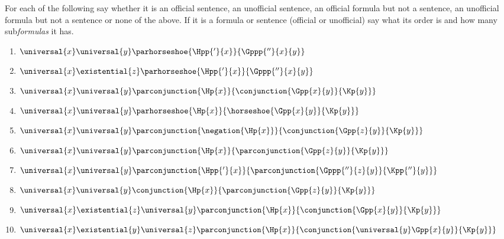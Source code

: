  For each of the following say whether it is an official sentence, an unofficial sentence, an official formula but not a sentence, an unofficial formula but not a sentence or none of the above. 
If it is a formula or sentence (official or unofficial) say what its order is and how many sub\emph{formulas} it has.
\begin{multicols}{2}
\begin{enumerate}
\item {$\universal{\variable{x}}\universal{\variable{y}}\parhorseshoe{\Hpp{'}{\variable{x}}}{\Gppp{''}{\variable{x}}{\variable{y}}}$}
\item {$\universal{\variable{x}}\existential{\variable{z}}\parhorseshoe{\Hpp{'}{\variable{x}}}{\Gppp{''}{\variable{x}}{\variable{y}}}$}
\item {$\universal{\variable{x}}\universal{\variable{y}}\parconjunction{\Hp{\variable{x}}}{\conjunction{\Gpp{\variable{x}}{\variable{y}}}{\Kp{\variable{y}}}}$}
\item {$\universal{\variable{x}}\universal{\variable{y}}\parhorseshoe{\Hp{\variable{x}}}{\horseshoe{\Gpp{\variable{x}}{\variable{y}}}{\Kp{\variable{y}}}}$}
\item {$\universal{\variable{x}}\universal{\variable{y}}\parconjunction{\negation{\Hp{\variable{x}}}}{\conjunction{\Gpp{\variable{z}}{\variable{y}}}{\Kp{\variable{y}}}}$}
\item {$\universal{\variable{x}}\universal{\variable{y}}\parconjunction{\Hp{\variable{x}}}{\parconjunction{\Gpp{\variable{z}}{\variable{y}}}{\Kp{\variable{y}}}}$}
\item {$\universal{\variable{x}}\universal{\variable{y}}\parconjunction{\Hpp{'}{\variable{x}}}{\parconjunction{\Gppp{''}{\variable{z}}{\variable{y}}}{\Kpp{''}{\variable{y}}}}$}
\item {$\universal{\variable{x}}\universal{\variable{y}}\conjunction{\Hp{\variable{x}}}{\parconjunction{\Gpp{\variable{z}}{\variable{y}}}{\Kp{\variable{y}}}}$}
\item {$\universal{\variable{x}}\existential{\variable{z}}\universal{\variable{y}}\parconjunction{\Hp{\variable{x}}}{\conjunction{\Gpp{\variable{x}}{\variable{y}}}{\Kp{\variable{y}}}}$}
\item {$\universal{\variable{x}}\existential{\variable{y}}\universal{\variable{z}}\parconjunction{\Hp{\variable{x}}}{\conjunction{\universal{\variable{y}}\Gpp{\variable{x}}{\variable{y}}}{\Kp{\variable{y}}}}$}
\end{enumerate}
\end{multicols}

